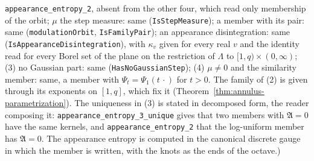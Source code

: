\begin{proposition}
{\texttt{appearance\_entropy\_2}, absent from the other four, which read only membership of the
orbit; $\mu$ the step measure: same (\texttt{IsStepMeasure}); a member with its pair: same
(\texttt{modulationOrbit}, \texttt{IsFamilyPair}); an appearance disintegration: same
(\texttt{IsAppearanceDisintegration}), with $\kappa_v$ given for every real $v$ and the identity
read for every Borel set of the plane on the restriction of $\Lambda$ to $[1,q) \times (0,\infty)$;
(3) no Gaussian part: same (\texttt{HasNoGaussianStep}); (4) $\mu \ne 0$ and the similarity member:
same, a member with $\Psi_t = \Psi_1(t\,\cdot)$ for $t > 0$. The family of (2) is given through its
exponents on $[1,q]$, which fix it (Theorem~\ref{thm:annulus-parametrization}). The uniqueness in
(3) is stated in decomposed form, the reader composing it: \texttt{appearance\_entropy\_3\_unique}
gives that two members with $\mathfrak{A} = 0$ have the same kernels, and
\texttt{appearance\_entropy\_2} that the log-uniform member has $\mathfrak{A} = 0$. The appearance
entropy is computed in the canonical discrete gauge in which the member is written, with the knots
as the ends of the octave.)}
\end{proposition}

